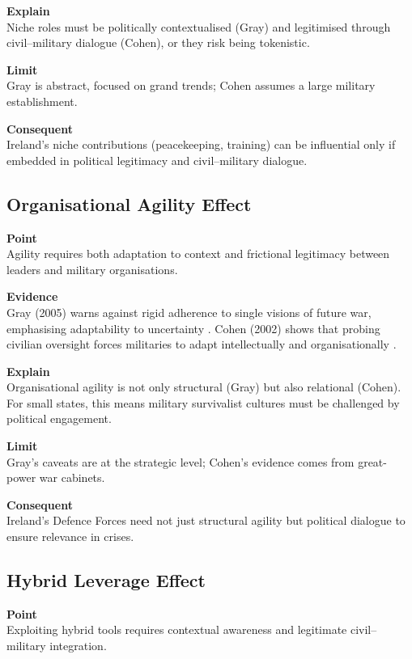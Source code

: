 \textbf{Explain} \\
Niche roles must be politically contextualised (Gray) and legitimised through civil--military dialogue (Cohen), or they risk being tokenistic.

\textbf{Limit} \\
Gray is abstract, focused on grand trends; Cohen assumes a large military establishment.

\textbf{Consequent} \\
Ireland’s niche contributions (peacekeeping, training) can be influential only if embedded in political legitimacy and civil--military dialogue.  

\subsection*{Organisational Agility Effect}

\textbf{Point} \\
Agility requires both adaptation to context and frictional legitimacy between leaders and military organisations.

\textbf{Evidence} \\
Gray (2005) warns against rigid adherence to single visions of future war, emphasising adaptability to uncertainty \parencite{GRAY_2005}.  
Cohen (2002) shows that probing civilian oversight forces militaries to adapt intellectually and organisationally \parencite{COHEN_2002}.  

\textbf{Explain} \\
Organisational agility is not only structural (Gray) but also relational (Cohen). For small states, this means military survivalist cultures must be challenged by political engagement.

\textbf{Limit} \\
Gray’s caveats are at the strategic level; Cohen’s evidence comes from great-power war cabinets.

\textbf{Consequent} \\
Ireland’s Defence Forces need not just structural agility but political dialogue to ensure relevance in crises.  

\subsection*{Hybrid Leverage Effect}

\textbf{Point} \\
Exploiting hybrid tools requires contextual awareness and legitimate civil--military integration.

